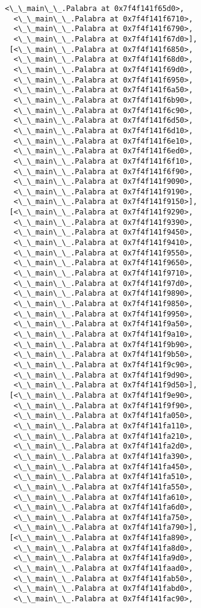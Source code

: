 \documentclass[12pt,a4paper,table]{article}
\begin{document}
\begin{tcolorbox}[breakable, size=fbox, boxrule=.5pt, pad at break*=1mm, opacityfill=0]
\begin{Verbatim}[commandchars=\\\{\}]
  <\_\_main\_\_.Palabra at 0x7f4f141f65d0>,
  <\_\_main\_\_.Palabra at 0x7f4f141f6710>,
  <\_\_main\_\_.Palabra at 0x7f4f141f6790>,
  <\_\_main\_\_.Palabra at 0x7f4f141f67d0>],
 [<\_\_main\_\_.Palabra at 0x7f4f141f6850>,
  <\_\_main\_\_.Palabra at 0x7f4f141f68d0>,
  <\_\_main\_\_.Palabra at 0x7f4f141f69d0>,
  <\_\_main\_\_.Palabra at 0x7f4f141f6950>,
  <\_\_main\_\_.Palabra at 0x7f4f141f6a50>,
  <\_\_main\_\_.Palabra at 0x7f4f141f6b90>,
  <\_\_main\_\_.Palabra at 0x7f4f141f6c90>,
  <\_\_main\_\_.Palabra at 0x7f4f141f6d50>,
  <\_\_main\_\_.Palabra at 0x7f4f141f6d10>,
  <\_\_main\_\_.Palabra at 0x7f4f141f6e10>,
  <\_\_main\_\_.Palabra at 0x7f4f141f6ed0>,
  <\_\_main\_\_.Palabra at 0x7f4f141f6f10>,
  <\_\_main\_\_.Palabra at 0x7f4f141f6f90>,
  <\_\_main\_\_.Palabra at 0x7f4f141f9090>,
  <\_\_main\_\_.Palabra at 0x7f4f141f9190>,
  <\_\_main\_\_.Palabra at 0x7f4f141f9150>],
 [<\_\_main\_\_.Palabra at 0x7f4f141f9290>,
  <\_\_main\_\_.Palabra at 0x7f4f141f9390>,
  <\_\_main\_\_.Palabra at 0x7f4f141f9450>,
  <\_\_main\_\_.Palabra at 0x7f4f141f9410>,
  <\_\_main\_\_.Palabra at 0x7f4f141f9550>,
  <\_\_main\_\_.Palabra at 0x7f4f141f9650>,
  <\_\_main\_\_.Palabra at 0x7f4f141f9710>,
  <\_\_main\_\_.Palabra at 0x7f4f141f97d0>,
  <\_\_main\_\_.Palabra at 0x7f4f141f9890>,
  <\_\_main\_\_.Palabra at 0x7f4f141f9850>,
  <\_\_main\_\_.Palabra at 0x7f4f141f9950>,
  <\_\_main\_\_.Palabra at 0x7f4f141f9a50>,
  <\_\_main\_\_.Palabra at 0x7f4f141f9a10>,
  <\_\_main\_\_.Palabra at 0x7f4f141f9b90>,
  <\_\_main\_\_.Palabra at 0x7f4f141f9b50>,
  <\_\_main\_\_.Palabra at 0x7f4f141f9c90>,
  <\_\_main\_\_.Palabra at 0x7f4f141f9d90>,
  <\_\_main\_\_.Palabra at 0x7f4f141f9d50>],
 [<\_\_main\_\_.Palabra at 0x7f4f141f9e90>,
  <\_\_main\_\_.Palabra at 0x7f4f141f9f90>,
  <\_\_main\_\_.Palabra at 0x7f4f141fa050>,
  <\_\_main\_\_.Palabra at 0x7f4f141fa110>,
  <\_\_main\_\_.Palabra at 0x7f4f141fa210>,
  <\_\_main\_\_.Palabra at 0x7f4f141fa2d0>,
  <\_\_main\_\_.Palabra at 0x7f4f141fa390>,
  <\_\_main\_\_.Palabra at 0x7f4f141fa450>,
  <\_\_main\_\_.Palabra at 0x7f4f141fa510>,
  <\_\_main\_\_.Palabra at 0x7f4f141fa550>,
  <\_\_main\_\_.Palabra at 0x7f4f141fa610>,
  <\_\_main\_\_.Palabra at 0x7f4f141fa6d0>,
  <\_\_main\_\_.Palabra at 0x7f4f141fa750>,
  <\_\_main\_\_.Palabra at 0x7f4f141fa790>],
 [<\_\_main\_\_.Palabra at 0x7f4f141fa890>,
  <\_\_main\_\_.Palabra at 0x7f4f141fa8d0>,
  <\_\_main\_\_.Palabra at 0x7f4f141fa9d0>,
  <\_\_main\_\_.Palabra at 0x7f4f141faad0>,
  <\_\_main\_\_.Palabra at 0x7f4f141fab50>,
  <\_\_main\_\_.Palabra at 0x7f4f141fabd0>,
  <\_\_main\_\_.Palabra at 0x7f4f141fac90>,

\end{Verbatim}
\end{tcolorbox}
\end{document}
